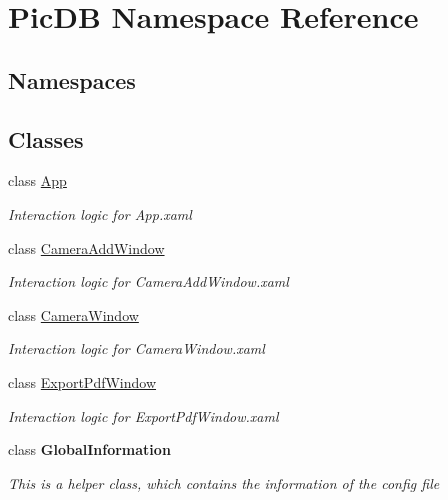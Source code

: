 \hypertarget{namespace_pic_d_b}{}\section{Pic\+DB Namespace Reference}
\label{namespace_pic_d_b}
\subsection*{Namespaces}
\begin{DoxyCompactItemize}
\end{DoxyCompactItemize}
\subsection*{Classes}
\begin{DoxyCompactItemize}
\item 
class \mbox{\hyperlink{class_pic_d_b_1_1_app}{App}}
\begin{DoxyCompactList}\small\item\em Interaction logic for App.\+xaml \end{DoxyCompactList}\item 
class \mbox{\hyperlink{class_pic_d_b_1_1_camera_add_window}{Camera\+Add\+Window}}
\begin{DoxyCompactList}\small\item\em Interaction logic for Camera\+Add\+Window.\+xaml \end{DoxyCompactList}\item 
class \mbox{\hyperlink{class_pic_d_b_1_1_camera_window}{Camera\+Window}}
\begin{DoxyCompactList}\small\item\em Interaction logic for Camera\+Window.\+xaml \end{DoxyCompactList}\item 
class \mbox{\hyperlink{class_pic_d_b_1_1_export_pdf_window}{Export\+Pdf\+Window}}
\begin{DoxyCompactList}\small\item\em Interaction logic for Export\+Pdf\+Window.\+xaml \end{DoxyCompactList}\item 
class {\bfseries Global\+Information}
\begin{DoxyCompactList}\small\item\em This is a helper class, which contains the information of the config file \end{DoxyCompactList}\item 

\end{DoxyCompactItemize}
